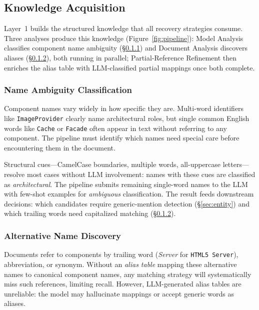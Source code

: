 

\subsection{Knowledge Acquisition}\label{sec:knowledge}

Layer~1 builds the structured knowledge that all recovery strategies
consume.
Three analyses produce this knowledge
(Figure~\ref{fig:pipeline}):
Model Analysis classifies component name ambiguity
(\S\ref{sec:names}) and Document Analysis discovers aliases
(\S\ref{sec:alias}), both running in parallel;
Partial-Reference Refinement then enriches the alias table with
LLM-classified partial mappings once both complete.

\subsubsection{Name Ambiguity Classification}\label{sec:names}

Component names vary widely in how specific they are.
Multi-word identifiers like \texttt{ImageProvider} clearly name
architectural roles, but single common English words like
\texttt{Cache} or \texttt{Facade} often appear in text without
referring to any component.
The pipeline must identify which names need special care before
encountering them in the document.

Structural cues---CamelCase boundaries, multiple words, all-uppercase
letters---resolve most cases without LLM involvement: names with these
cues are classified as \emph{architectural}.
The pipeline submits remaining single-word names to the LLM with
few-shot examples for \emph{ambiguous} classification.
The result feeds downstream decisions:
which candidates require generic-mention detection
(\S\ref{sec:entity}) and
which trailing words need capitalized matching
(\S\ref{sec:alias}).

\subsubsection{Alternative Name Discovery}\label{sec:alias}

Documents refer to components by trailing word (\emph{Server} for
\texttt{HTML5~Server}), abbreviation, or synonym.
Without an \emph{alias table} mapping these alternative names to
canonical component names, any matching strategy will
systematically miss such references, limiting recall.
However, LLM-generated alias tables are unreliable: the model
may hallucinate mappings or accept generic words as aliases.

